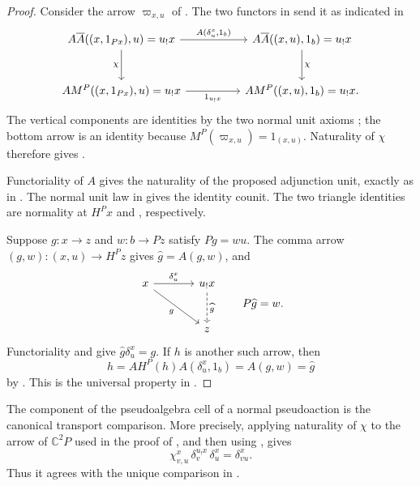\documentclass[11pt]{article}
\theoremstyle{plain}
\theoremstyle{definition}
\theoremstyle{remark}
\newcommand{\C}{\mathbb{C}}
\numberwithin{equation}{section}
\begin{document}
\begin{proof}
Consider the arrow $\varpi_{x,u}$ of
.  The two functors in
 send it as indicated in
\begin{equation*}
\begin{tikzcd}[column sep=huge,row sep=large]
A\overline A((x,1_{Px}),u)=u_!x
  \arrow[r,"{A(\delta^x_u,1_b)}"]
  \arrow[d,"\chi"']
& A\overline A((x,u),1_b)=u_!x
  \arrow[d,"\chi"] \\
AM^P((x,1_{Px}),u)=u_!x
  \arrow[r,"1_{u_!x}"']
& AM^P((x,u),1_b)=u_!x .
\end{tikzcd}
\end{equation*}
The vertical components are identities by the two normal unit axioms
; the bottom arrow is an identity
because $M^P(\varpi_{x,u})=1_{(x,u)}$.  Naturality of $\chi$ therefore
gives .

Functoriality of $A$ gives the naturality of the proposed adjunction
unit, exactly as in .  The normal unit
law in  gives the identity counit.  The two
triangle identities are normality at $H^Px$ and
, respectively.

Suppose $g\colon x\to z$ and $w\colon b\to Pz$ satisfy $Pg=wu$.  The
comma arrow $(g,w)\colon(x,u)\to H^Pz$ gives
$\widehat g=A(g,w)$, and
\begin{equation*}
\begin{tikzcd}[column sep=large,row sep=large]
x \arrow[r,"\delta^x_u"] \arrow[dr,"g"']
& u_!x \arrow[d,dashed,"\widehat g"] \\
& z
\end{tikzcd}
\qquad P\widehat g=w.
\end{equation*}
Functoriality and  give
$\widehat g\delta^x_u=g$.  If $h$ is another such arrow, then
\begin{equation*}
  h=AH^P(h)A(\delta^x_u,1_b)=A(g,w)=\widehat g
\end{equation*}
by .  This is the universal property in
.
\end{proof}

The component of the pseudoalgebra cell of a normal pseudoaction is the
canonical transport comparison.  More precisely, applying naturality of
$\chi$ to the arrow of $\C^2P$ used in the proof of
, and then using
, gives
\begin{equation}
  \chi^x_{v,u}\,
  \delta^{u_!x}_{v}\,
  \delta^x_u=\delta^x_{vu}.
  \label{eq:pseudo-compositor-characterization}
\end{equation}
Thus it agrees with the unique comparison in
.
\end{document}
